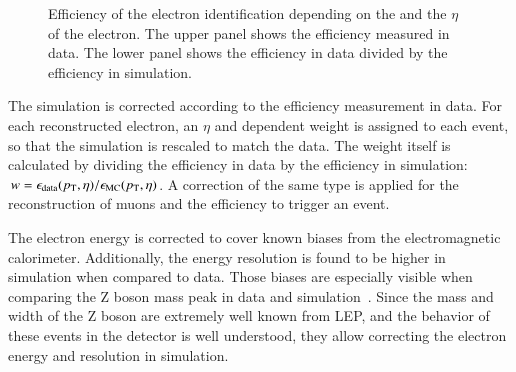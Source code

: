 \begin{figure}[htbp!]
  \begin{center}
\caption{Efficiency of the electron identification depending on the \pt and the $\eta$ of the electron\cite{CMS-DP-2017-004}.
         The upper panel shows the efficiency measured in data. The lower panel shows the efficiency in data divided by the efficiency in simulation. 
  \label{fig:reco_eleeff}}
  \end{center}
\end{figure}

The simulation is corrected according to the efficiency measurement in data. For each reconstructed electron, an $\eta$ and \pt dependent weight is assigned to each event,
so that the simulation is rescaled to match the data. The weight itself is calculated by dividing the efficiency in data by the efficiency in simulation: $w = \epsilon_{\mathrm{data}} (p_{\mathrm{T}},\eta) /\epsilon_{\mathrm{MC}} (p_{\mathrm{T}},\eta)$.
A correction of the same type is applied for the reconstruction of muons and the efficiency to trigger an event.

The electron energy is corrected to cover known biases from the electromagnetic calorimeter. Additionally, the energy resolution is found to be higher in simulation when compared to data.
Those biases are especially visible when comparing the Z boson mass peak in data and simulation~\cite{CMS-DP-2016-026}.
Since the mass and width of the Z boson are extremely well known from LEP, and the behavior of these events in the detector is well understood, they allow correcting the electron energy and resolution in simulation.

